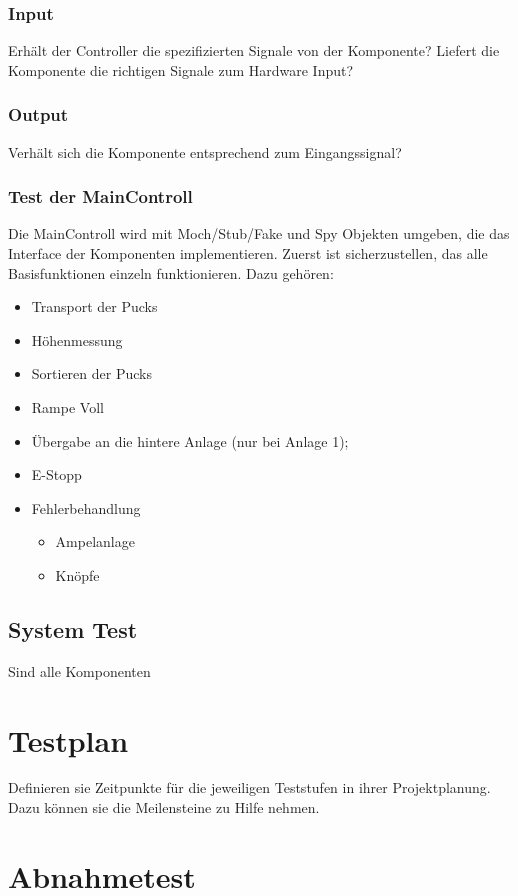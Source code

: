 \subsubsection{Input}
Erhält der Controller die spezifizierten Signale von der Komponente? Liefert die Komponente die richtigen Signale zum Hardware Input?

\subsubsection{Output}
Verhält sich die Komponente entsprechend zum Eingangssignal?

\subsubsection{Test der MainControll}
Die MainControll wird mit Moch/Stub/Fake und Spy Objekten umgeben, die das Interface der Komponenten implementieren.
Zuerst ist sicherzustellen, das alle Basisfunktionen einzeln funktionieren. Dazu gehören:
\begin{itemize} 
	\item Transport der Pucks
	\item Höhenmessung
	\item Sortieren der Pucks
	\item Rampe Voll
	\item Übergabe an die hintere Anlage (nur bei Anlage 1);
	\item E-Stopp
	\item Fehlerbehandlung
	\begin{itemize}
		\item Ampelanlage
		\item Knöpfe
	\end{itemize}
\end{itemize}



\subsection{System Test}
Sind alle Komponenten 

\section{Testplan}

Definieren sie Zeitpunkte für die jeweiligen Teststufen in ihrer
Projektplanung. Dazu können sie die Meilensteine zu Hilfe nehmen.

\section{Abnahmetest}

